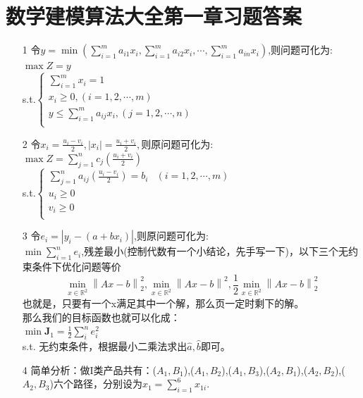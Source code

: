 \documentclass[a4paper,20pt]{article}
\begin{document}
\section{数学建模算法大全第一章习题答案}
\begin{itemize}
    \item[1] 令$y=\min(\sum_{i=1}^{m}a_{i1}x_i,\sum_{i=1}^{m}a_{i2}x_i,\cdots,\sum_{i=1}^{m}a_{in}x_i)$,则问题可化为:
        \\$\max Z=y$
            \\s.t.$ \left\{\begin{matrix}
            \sum_{i=1}^{m}x_i=1                             \\
            x_i\geq 0,(i=1,2,\cdots,m)                      \\
            y \leq \sum_{i=1}^{m}a_{ij}x_i,(j=1,2,\cdots,n) \\
        \end{matrix}\right.$
    \item[2] 令$x_i=\frac{u_i-v_i}{2},|x_i|=\frac{u_i+v_i}{2},$则原问题可化为:
        \\$\max Z=\sum_{j=1}^{n}c_{j}(\frac{u_i+v_i}{2})$
            \\s.t.$\left\{
        \begin{matrix}
            \sum_{j=1}^{n}a_{ij}(\frac{u_i-v_i}{2})=b_i & (i=1,2,\cdots,m) \\
            u_i\geq 0                                                      \\
            v_i\geq 0                                                      \\
        \end{matrix}
        \right.$
    \item[3] 令$e_i=|y_i-(a+bx_i)|$,则原问题可化为:
        \\ $\min\sum_{i=1}^{n}e_i$,残差最小(控制代数有一个小结论，先手写一下)，以下三个无约束条件下优化问题等价$$ \min\limits_{x\in\mathbb{R}^2}{\left\lVert Ax-b\right\rVert}_2^2,\min\limits_{x\in\mathbb{R}^2}{\left\lVert Ax-b\right\rVert}^2,\frac{1}{2}\min\limits_{x\in\mathbb{R}^2}{\left\lVert Ax-b\right\rVert}_2^2  $$也就是，只要有一个x满足其中一个解，那么页一定时剩下的解。
        \\那么我们的目标函数也就可以化成：
        \\$\min \mathbf{J}_1=\frac{1}{2}\sum_{i}^{n}e_i^2$
            \\s.t. 无约束条件，根据最小二乘法求出$\hat{a} ,\hat{b}$即可。
    \item[4] 简单分析：做I类产品共有：($A_1,B_1$),($A_1,B_2$),($A_1,B_3$),($A_2,B_1$),($A_2,B_2$),($A_2,B_3$)六个路径，分别设为$x_1=\sum_{i=1}^{6}x_{1i}$.

\end{itemize}
\end{document}
